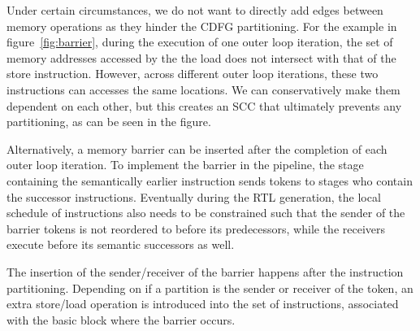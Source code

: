 Under certain circumstances, we do not want to directly add edges between memory operations
as they hinder the CDFG partitioning. For the example in figure~\ref{fig:barrier}, during the execution of one outer loop iteration, the set of memory addresses accessed by the the load does not intersect
with that of the store instruction. However, across different outer loop iterations, these
two instructions can accesses the same locations. 
We can conservatively make them dependent
on each other, but this creates an SCC that ultimately prevents any partitioning, as can be
seen in the figure.



Alternatively, a memory barrier can be inserted after the completion of 
each outer loop iteration. To implement the barrier in the pipeline, the stage containing
the semantically earlier instruction sends tokens to stages who contain the successor
instructions. Eventually during the RTL generation, the local schedule of instructions also needs to be constrained such that the sender of the barrier tokens is not reordered to before its predecessors, while the receivers execute before its semantic successors as well.

The insertion of the sender/receiver of the barrier happens after the instruction partitioning. Depending on if a partition is the sender or receiver of the token,
an extra store/load operation is introduced into the set of instructions, associated
with the basic block where the barrier occurs.

